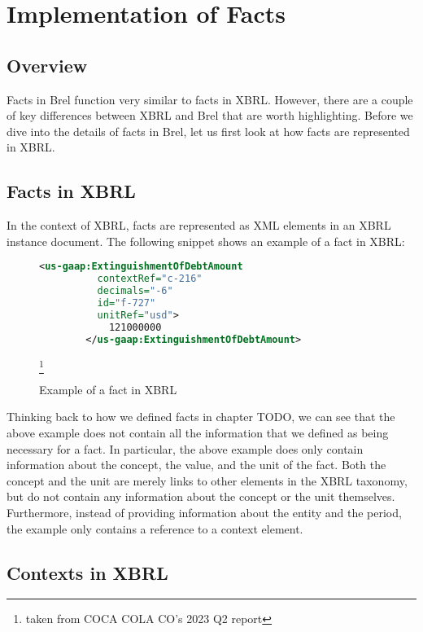 \section{Implementation of Facts}

\subsection{Overview}

Facts in Brel function very similar to facts in XBRL. 
However, there are a couple of key differences between XBRL and Brel that are worth highlighting.
Before we dive into the details of facts in Brel, let us first look at how facts are represented in XBRL.

\subsection{Facts in XBRL}

In the context of XBRL, facts are represented as XML elements in an XBRL instance document. 
The following snippet shows an example of a fact in XBRL:

\begin{figure}[H]
    \caption{Example of a fact in XBRL}
    \label{fig:example_fact_xbrl}
    \begin{lstlisting}[language=XML]
        <us-gaap:ExtinguishmentOfDebtAmount 
          contextRef="c-216" 
          decimals="-6" 
          id="f-727" 
          unitRef="usd">
            121000000
        </us-gaap:ExtinguishmentOfDebtAmount>
    \end{lstlisting}\footnote{taken from COCA COLA CO's 2023 Q2 report}
\end{figure}


Thinking back to how we defined facts in chapter TODO,
we can see that the above example does not contain all the information that we defined as being necessary for a fact.
In particular, the above example does only contain information about the concept, the value, and the unit of the fact.
Both the concept and the unit are merely links to other elements in the XBRL taxonomy, but do not contain any information about the concept or the unit themselves.
Furthermore, instead of providing information about the entity and the period, the example only contains a reference to a context element. 

\subsection{Contexts in XBRL}

